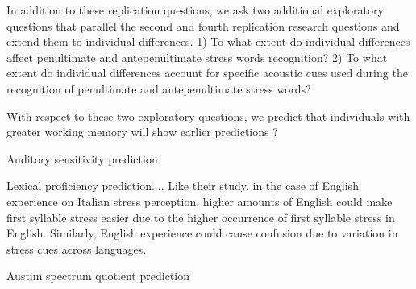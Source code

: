 In addition to these replication questions, we ask two additional exploratory questions that parallel the second and fourth replication research questions and extend them to individual differences. 1) To what extent do individual differences affect penultimate and antepenultimate stress words recognition? 2) To what extent do individual differences account for specific acoustic cues used during the recognition of penultimate and antepenultimate stress words?

With respect to these two exploratory questions, we predict that individuals with greater working memory will show earlier predictions ? \citep[e.g.,][]{Traxler2009}

Auditory sensitivity prediction

Lexical proficiency prediction....  Like their study, in the case of English experience on Italian stress perception, higher amounts of English could make first syllable stress easier due to the higher occurrence of first syllable stress in English. Similarly, English experience could cause confusion due to variation in stress cues across languages.

Austim spectrum quotient prediction
